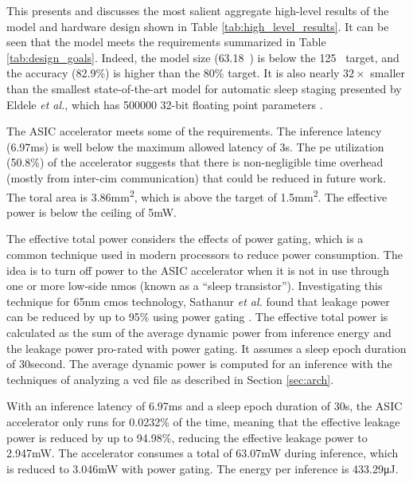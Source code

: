 This presents and discusses the most salient aggregate high-level results of the model and hardware design shown in Table \ref{tab:high_level_results}.
It can be seen that the model meets the requirements summarized in Table \ref{tab:design_goals}. Indeed, the model size (63.18\si{\kilo\byte}) is below the
125\si{\kilo\byte} target, and the accuracy (82.9\%) is higher than the 80\% target. It is also nearly $32\times$ smaller than the smallest state-of-the-art
model for automatic sleep staging presented by Eldele \textit{et al.}, which has 500000 32-bit floating point parameters \cite{eldele2021attention}.

The ASIC accelerator meets some of the requirements. The inference latency (6.97\si{\milli\second}) is well below the maximum allowed latency of 3\si{\second}.
The \ac{pe} utilization (50.8\%) of the accelerator suggests that there is non-negligible time overhead (mostly from inter-\ac{cim} communication) that could be
reduced in future work. The toral area is 3.86\si{\square\milli\meter}, which is above the target of 1.5\si{\square\milli\meter}. The effective power is below the
ceiling of 5\si{\milli\watt}.

The effective total power considers the effects of power gating, which is a common technique used in modern processors to reduce power consumption. The idea
is to turn off power to the ASIC accelerator when it is not in use through one or more low-side \ac{nmos} (known as a ``sleep transistor''). Investigating this
technique for 65nm \ac{cmos} technology, Sathanur \textit{et al.} found that leakage power can be reduced by up to 95\% using power gating \cite{sathanur2008quantifying}.
The effective total power is calculated as the sum of the average dynamic power from inference energy and the leakage power pro-rated with power gating. It assumes a
sleep epoch duration of 30\si{second}. The average dynamic power is computed for an inference with the techniques of analyzing a \ac{vcd} file as described in 
Section \ref{sec:arch}.

With an inference latency of 6.97\si{\milli\second} and a sleep epoch duration of 30\si{\second}, the ASIC accelerator only runs for 0.0232\% of the time, meaning
that the effective leakage power is reduced by up to 94.98\%, reducing the effective leakage power to 2.947\si{\milli\watt}. The accelerator consumes a total of
63.07\si{\milli\watt} during inference, which is reduced to 3.046\si{\milli\watt} with power gating. The energy per inference is 433.29\si{\micro\joule}. 

